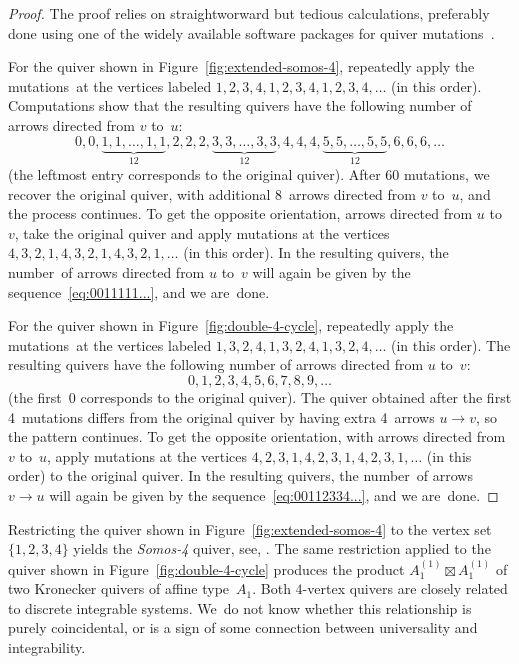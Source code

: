 \documentclass[ALCO,ThmDefs,Unicode,epreuves,published]{cedram}
\begin{document}
\begin{proof}
The proof relies on straightworward but tedious calculations, preferably done using one of the widely available software packages for quiver mutations~\cite{keller-applet, musiker-stump}. 

For the quiver shown in Figure~\ref{fig:extended-somos-4}, repeatedly apply the mutations~at the vertices labeled $1,2,3,4,1,2,3,4,1,2,3,4,\dots$
(in this order). Computations show that the resulting quivers have the following number of arrows directed from $v$ to~$u$:
\begin{equation}
\label{eq:0011111...}
0, 0, \underbrace{1,1,\dots,1,1}_{12},2,2,2,\underbrace{3,3,\dots,3,3}_{12},4,4,4,\underbrace{5,5,\dots,5,5}_{12},6,6,6,\dots
\end{equation}
(the leftmost entry corresponds to the original quiver). 
After 60 mutations, we recover the original quiver, with additional 8~arrows directed from $v$ to~$u$, and the process continues. To get the opposite orientation, \ie arrows directed from $u$ to~$v$, take the original quiver and apply mutations at the vertices $4,3,2,1,4,3,2,1,4,3,2,1,\dots$ (in this order). 
In the resulting quivers, the number~of arrows directed from $u$ to~$v$ will again be given by the sequence~\eqref{eq:0011111...}, and we are~done. 

For the quiver shown in Figure~\ref{fig:double-4-cycle}, repeatedly apply the mutations~at the vertices labeled $1,3,2,4,1,3,2,4,1,3,2,4,\dots$ (in this order). The resulting quivers have the following number of arrows directed from $u$ to~$v$:
\begin{equation}
\label{eq:00112334...}
0,1,2,3,4,5,6,7,8,9,\dots
\end{equation}
(the first~0 corresponds to the original quiver). 
The quiver obtained after the first 4~mutations differs from the original quiver by having extra 4~arrows $u\!\longrightarrow \!v$, so the pattern continues. To get the opposite orientation, with arrows directed from $v$ to~$u$, apply mutations at the vertices $4,2,3,1,4,2,3,1,4,2,3,1,\dots$ (in this order) to the original quiver. 
In the resulting quivers, the number~of arrows $v\!\longrightarrow \!u$ will again be given by the sequence~\eqref{eq:00112334...}, and we are~done. 
\end{proof}


\begin{remark}
Restricting the quiver shown in Figure~\ref{fig:extended-somos-4} to the vertex set $\{1,2,3,4\}$ yields the \emph{Somos-4} quiver, see, \eg \cite[Section~7.1]{marsh-lectures}. 
The same restriction applied to the quiver shown in Figure~\ref{fig:double-4-cycle} produces the product $A_1^{(1)}\boxtimes A_1^{(1)}$ of two Kronecker quivers of affine type~$A_1$. Both $4$-vertex quivers are closely related to discrete integrable systems. We~do not know whether this relationship is purely coincidental, or is a sign of some connection between universality and integrability. 
\end{remark}
\end{document}
